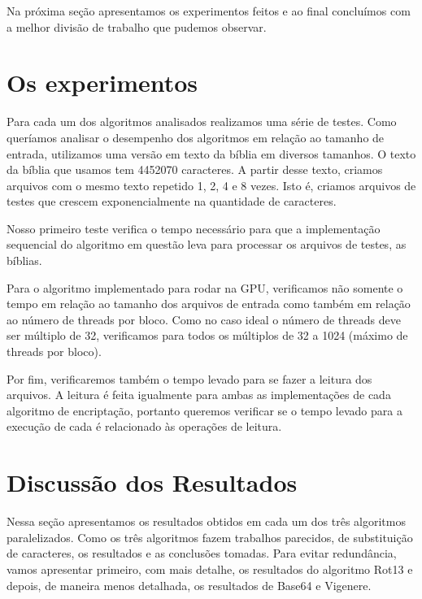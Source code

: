 \documentclass[12pt]{article}
\begin{document}
Na próxima seção apresentamos os experimentos feitos e ao final 
concluímos com a melhor divisão de trabalho que pudemos observar.


\newpage
\section{Os experimentos}
Para cada um dos algoritmos analisados realizamos uma série de testes. 
Como queríamos analisar o desempenho dos algoritmos em relação ao 
tamanho de entrada, utilizamos uma versão em texto da bíblia em
diversos tamanhos. O texto da bíblia que usamos tem 4452070 caracteres.
A partir desse texto, criamos arquivos com o mesmo texto repetido 1, 2,
4 e 8 vezes. Isto é, criamos arquivos de testes que crescem 
exponencialmente na quantidade de caracteres.

Nosso primeiro teste verifica o tempo necessário para que a 
implementação sequencial do algoritmo em questão leva para processar os
arquivos de testes, as bíblias.

Para o algoritmo implementado para rodar na GPU, verificamos não
somente o tempo em relação ao tamanho dos arquivos de entrada como
também em relação ao número de threads por bloco. Como no caso ideal o
número de threads deve ser múltiplo de 32, verificamos para todos os
múltiplos de 32 a 1024 (máximo de threads por bloco).

Por fim, verificaremos também o tempo levado para se fazer a leitura dos
arquivos. A leitura é feita igualmente para ambas as implementações de
cada algoritmo de encriptação, portanto queremos verificar se o tempo
levado para a execução de cada é relacionado às operações de leitura.


\newpage
\section{Discussão dos Resultados}
Nessa seção apresentamos os resultados obtidos em cada um dos três 
algoritmos paralelizados. Como os três algoritmos fazem trabalhos 
parecidos, de substituição de caracteres, os resultados e as conclusões tomadas. Para evitar redundância, vamos 
apresentar primeiro, com mais detalhe, os resultados do algoritmo Rot13
e depois, de maneira menos detalhada, os resultados de Base64 e 
Vigenere.
\end{document}

